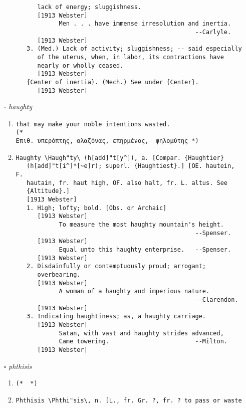 \documentclass{article}
\begin{document}
\begin{itemize}
\begin{enumerate}
{\begin{lstlisting}
      lack of energy; sluggishness.
      [1913 Webster]
            Men . . . have immense irresolution and inertia.
                                                  --Carlyle.
      [1913 Webster]
   3. (Med.) Lack of activity; sluggishness; -- said especially
      of the uterus, when, in labor, its contractions have
      nearly or wholly ceased.
      [1913 Webster]
   {Center of inertia}. (Mech.) See under {Center}.
      [1913 Webster]
\end{lstlisting}}
\end{enumerate}
\item[$\square$] \emph{ haughty }
\begin{enumerate}
\item{
\begin{lstlisting}that may make your noble intentions wasted.
(* 
Επιθ. υπερόπτης, αλαζόνας, επηρμένος,  ψηλομύτης *)
\end{lstlisting}}
\item{
\begin{lstlisting}
Haughty \Haugh"ty\ (h[add]"t[y^]), a. [Compar. {Haughtier}
   (h[add]"t[i^]*[~e]r); superl. {Haughtiest}.] [OE. hautein, F.
   hautain, fr. haut high, OF. also halt, fr. L. altus. See
   {Altitude}.]
   [1913 Webster]
   1. High; lofty; bold. [Obs. or Archaic]
      [1913 Webster]
            To measure the most haughty mountain's height.
                                                  --Spenser.
      [1913 Webster]
            Equal unto this haughty enterprise.   --Spenser.
      [1913 Webster]
   2. Disdainfully or contemptuously proud; arrogant;
      overbearing.
      [1913 Webster]
            A woman of a haughty and imperious nature.
                                                  --Clarendon.
      [1913 Webster]
   3. Indicating haughtiness; as, a haughty carriage.
      [1913 Webster]
            Satan, with vast and haughty strides advanced,
            Came towering.                        --Milton.
      [1913 Webster]
\end{lstlisting}}
\end{enumerate}
\item[$\square$] \emph{ phthisis }
\begin{enumerate}
\item{
\begin{lstlisting}
(*  *)
\end{lstlisting}}
\item{
\begin{lstlisting}
Phthisis \Phthi"sis\, n. [L., fr. Gr. ?, fr. ? to pass or waste

\end{lstlisting}}
\end{enumerate}
\end{itemize}
\end{document}
